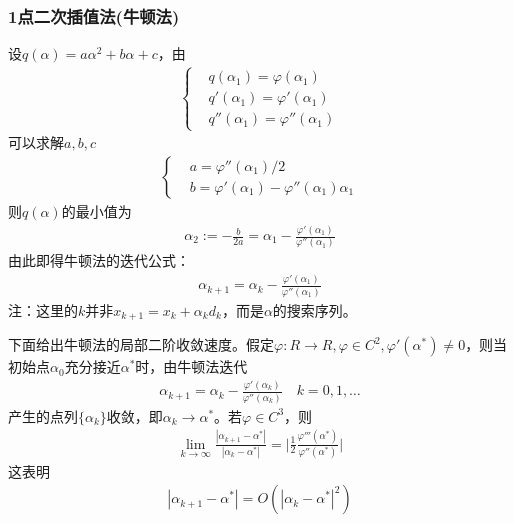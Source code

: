         \subsubsection{1点二次插值法(牛顿法)}
            \par
            设$q(\alpha)=a{\alpha}^2+b{\alpha}+c$，由
            \begin{align*}
            \left\{
            \begin{aligned}
            &{}q({\alpha}_1)=\varphi({\alpha}_1)\\
            &{}q'({\alpha}_1)=\varphi'({\alpha}_1)\\
            &{}q''({\alpha}_1)=\varphi''({\alpha}_1)
            \end{aligned}
            \right.
            \end{align*}
            可以求解$a,b,c$
            \begin{align*}
            \left\{
            \begin{aligned}
            &{}a=\varphi''{({\alpha}_1)/2}\\
            &{}b=\varphi'({\alpha}_1)-\varphi''({\alpha}_1){\alpha}_1
            \end{aligned}
            \right.
            \end{align*}
            则$q(\alpha)$的最小值为
            \begin{align*}
            {\alpha}_2:=-\frac {b}{2a}={\alpha}_1-\frac{\varphi'({\alpha}_1)}{\varphi''({\alpha}_1)}
            \end{align*}
            由此即得牛顿法的迭代公式：
            \begin{align*}
            {\alpha}_{k+1}={\alpha}_k-\frac{\varphi'({\alpha}_1)}{\varphi''({\alpha}_1)}
            \end{align*}
            注：这里的$k$并非$x_{k+1}=x_k+{\alpha}_k d_k$，而是$\alpha$的搜索序列。
            \par
            下面给出牛顿法的局部二阶收敛速度。假定$\varphi:R\to R,\varphi \in C^2,{\varphi}'({\alpha}^*) \ne 0 $，则当初始点${\alpha}_0$充分接近${\alpha}^*$时，由牛顿法迭代
            \begin{align*}
            {\alpha}_{k+1}={\alpha}_k-\frac{\varphi'({\alpha}_k)}{\varphi''({\alpha}_k)}\quad k=0,1,\ldots
            \end{align*}
            产生的点列$\{{\alpha}_k\}$收敛，即${\alpha}_k \to {\alpha}^*$。若$\varphi \in C^3$，则
            \begin{align*}
            \mathop {\lim} \limits_{k \to \infty}\frac {|{\alpha}_{k+1}-{\alpha}^*|}{|{\alpha}_{k}-{\alpha}^*|}=\bigg|\frac 12 \frac{\varphi'''({\alpha}^*)}{\varphi''({\alpha}^*)}\bigg|
            \end{align*}
            这表明
            \begin{align*}
            |{\alpha}_{k+1}-{\alpha}^*|=O(|{\alpha}_k-{\alpha}^{*}|^2)
            \end{align*}
